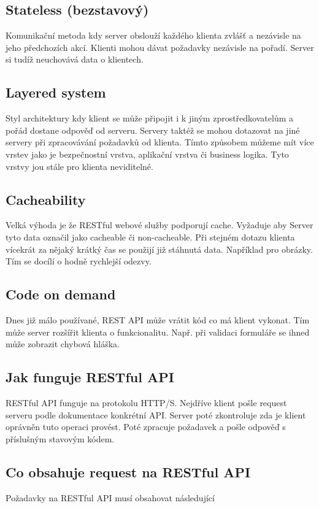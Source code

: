 \subsection{Stateless (bezstavový)}
Komunikační metoda kdy server obslouží každého klienta zvlášť a nezávisle na jeho předchozích akcí. Klienti mohou dávat požadavky nezávisle na pořadí. Server si tudíž neuchovává data o klientech.

\subsection{Layered system}
Styl architektury kdy klient se může připojit i k jiným zprostředkovatelům a pořád dostane odpověď od serveru. Servery taktéž se mohou dotazovat na jiné servery při zpracovávání požadavků od klienta. Tímto způsobem můžeme mít více vrstev jako je bezpečnostní vrstva, aplikační vrstva či business logika.
Tyto vrstvy jou stále pro klienta neviditelné.

\subsection{Cacheability}
Velká výhoda je že RESTful webové služby podporují cache. Vyžaduje aby Server tyto data označil jako cacheable či non-cacheable. Při stejném dotazu klienta vícekrát za nějaký krátký čas se použijí již stáhnutá data. Například pro obrázky. Tím se docílí o hodně rychlejší odezvy.

\subsection{Code on demand}
Dnes již málo používané, REST API může vrátit kód co má klient vykonat. Tím může server rozšířit klienta o funkcionalitu. Např. při validaci formuláře se ihned může zobrazit chybová hláška.



\subsection{Jak funguje RESTful API} %
RESTful API funguje na protokolu HTTP/S. Nejdříve klient pošle request serveru podle dokumentace konkrétní API. Server poté zkontroluje zda je klient oprávněn tuto operaci provést. Poté zpracuje požadavek a pošle odpověď s příslušným stavovým kódem.

\subsection{Co obsahuje request na RESTful API} %
Požadavky na RESTful API musí obsahovat následující
